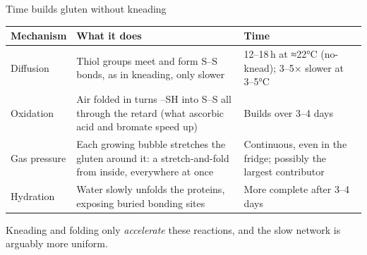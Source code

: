 \documentclass[aspectratio=169,11pt]{beamer}
\newcommand{\muted}[1]{{\color{muted}#1}}
\newcommand{\tablestart}[2]{\begingroup\renewcommand{\arraystretch}{#1}#2}
\newcommand{\tableend}{\endgroup\par}
\begin{document}
\begin{frame}{Time builds gluten without kneading}
  \tablestart{1.0}{\footnotesize}
  \begin{tabularx}{\linewidth}{@{}P{2.0cm}LP{4.4cm}@{}}
    \toprule
    \textbf{Mechanism} & \textbf{What it does} & \textbf{Time} \\
    \midrule
    Diffusion & Thiol groups meet and form S–S bonds, as in kneading, only slower
      & 12–18\,h at ≈22°C (no-knead); 3–5× slower at 3–5°C \\
    Oxidation & Air folded in turns –SH into S–S all through the retard (what ascorbic
      acid and bromate speed up) & Builds over 3–4 days \\
    Gas pressure & Each growing bubble stretches the gluten around it: a stretch-and-fold
      from inside, everywhere at once & Continuous, even in the fridge; possibly the
      largest contributor \\
    Hydration & Water slowly unfolds the proteins, exposing buried bonding sites
      & More complete after 3–4 days \\
    \bottomrule
  \end{tabularx}
  \tableend
  {\footnotesize\muted{Kneading and folding only \emph{accelerate} these reactions, and
  the slow network is arguably more uniform.}\par}
\end{frame}
\end{document}
